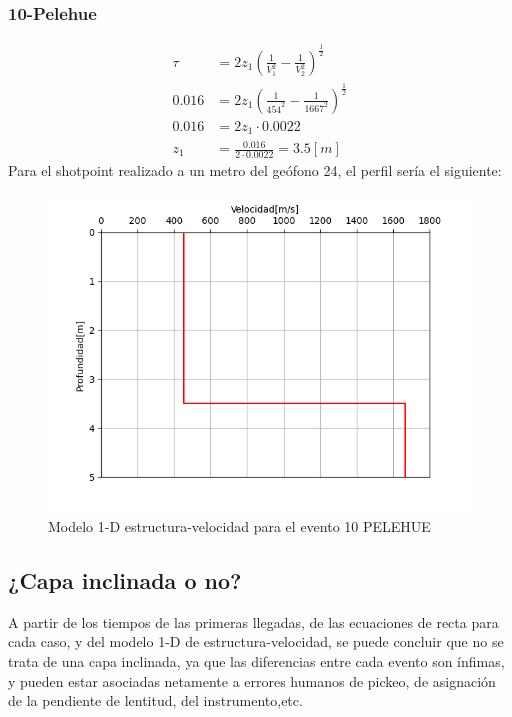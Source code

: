 \documentclass{article}
\theoremstyle{mytheoremstyle}
\theoremstyle{mytheoremstyle}
\theoremstyle{myproblemstyle}
\begin{document}
\subsubsection*{10-Pelehue}
\begin{align*}
	\tau&=2z_1\left(\frac{1}{V_1^2}-\frac{1}{V_2^2}\right)^\frac{1}{2}\\ 
	0.016&=2z_1\left(\frac{1}{454^2}-\frac{1}{1667^2}\right)^\frac{1}{2} \\ 
	0.016&=2z_1\cdot 0.0022\\
	z_1&=\frac{0.016}{2\cdot 0.0022}=3.5 [m]
\end{align*}
Para el shotpoint realizado a un metro del geófono 24, el perfil sería el siguiente:
\par \begin{figure}[h!]
	\includegraphics[width=1\textwidth,center]{vel-depth2.png}
	\caption{Modelo 1-D estructura-velocidad para el evento 10 PELEHUE}
\end{figure}\newpage
\subsection*{¿Capa inclinada o no?}
A partir de los tiempos de las primeras llegadas, de las ecuaciones de recta 
para cada caso, y del modelo 1-D de estructura-velocidad, se puede concluir que no se trata 
de una capa inclinada, ya que las diferencias entre cada evento son ínfimas, 
y pueden estar asociadas netamente a errores humanos de pickeo,
 de asignación de la pendiente de lentitud, del instrumento,etc.
 \newpage
\end{document}
